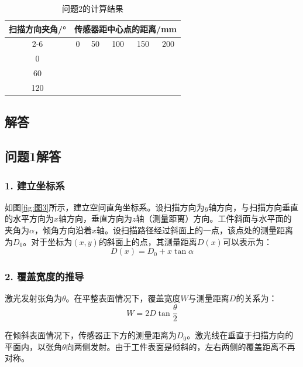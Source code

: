 \documentclass{article}
\begin{document}
	\begin{table}[h!]
		\centering
		\caption{问题2的计算结果}
		\begin{tabular}{cccccc}
			\toprule
			\multirow{2}{*}{扫描方向夹角/°} & \multicolumn{5}{c}{传感器距中心点的距离/mm} \\
			\cmidrule(lr){2-6}
			& 0 & 50 & 100 & 150 & 200 \\
			\midrule
			0 & & & & & \\
			60 & & & & & \\
			120 & & & & & \\
			\bottomrule
		\end{tabular}
	\end{table}
	
	\newpage
	
	\begin{center}
		\section*{解答}
	\end{center}
	
	\subsection*{问题1解答}
	
	\subsubsection*{1. 建立坐标系}
	
	如图\ref{fig:图3}所示，建立空间直角坐标系。设扫描方向为\(y\)轴方向，与扫描方向垂直的水平方向为\(x\)轴方向，垂直方向为\(z\)轴（测量距离）方向。工件斜面与水平面的夹角为\(\alpha\)，倾角方向沿着\(x\)轴。设扫描路径经过斜面上的一点，该点处的测量距离为\(D_0\)。对于坐标为\((x, y)\)的斜面上的点，其测量距离\(D(x)\)可以表示为：
	\[
	D(x) = D_0 + x \tan \alpha
	\]
	
	\subsubsection*{2. 覆盖宽度的推导}
	
	激光发射张角为\(\theta\)。在平整表面情况下，覆盖宽度\(W\)与测量距离\(D\)的关系为：
	\[
	W = 2D \tan \frac{\theta}{2}
	\]
	
	在倾斜表面情况下，传感器正下方的测量距离为\(D_0\)。激光线在垂直于扫描方向的平面内，以张角\(\theta\)向两侧发射。由于工件表面是倾斜的，左右两侧的覆盖距离不再对称。
	
\end{document}
